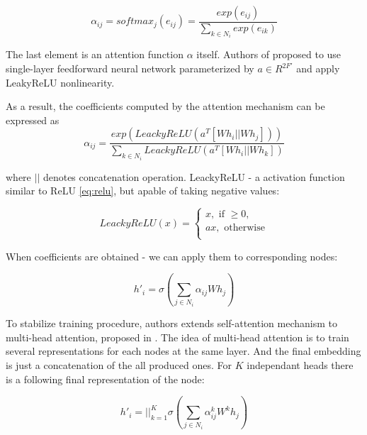 \begin{equation}
   \alpha_{ij} = softmax_j(e_{ij}) = \frac{exp(e_{ij})}{\sum_{k \in N_i}exp(e_{ik})}
\end{equation}

The last element is an attention function $\alpha$ itself. Authors of \cite{GAT} proposed to use
single-layer feedforward neural network parameterized by $a \in R^{2F'}$ and apply LeakyReLU nonlinearity.

As a result, the coefficients computed by the attention mechanism can be expressed as
\begin{equation}
    \alpha_{ij} = \frac{exp(LeackyReLU(a^{T}[Wh_i || Wh_j]))}{\sum_{k \in N_i}LeackyReLU(a^{T}[Wh_i || Wh_k])}
    \label{eq:final_att_coef}
 \end{equation}

where $||$ denotes concatenation operation. LeackyReLU - a activation function similar to ReLU \ref{eq:relu}, but
apable of taking negative values:

\begin{equation}
    LeackyReLU(x) = 
    \begin{cases}
        x, \text{ if } \geq 0, \\
        ax, \text{ otherwise} \\
    \end{cases}
    \label{eq:leacky_relu}
\end{equation}



When coefficients are obtained - we can apply them to corresponding nodes:

\begin{equation}
    h'_i = \sigma \left( \sum_{j \in {N_i}} \alpha_{ij} W h_j \right)
    \label{eq:final_att}
 \end{equation}

To stabilize training procedure, authors extends self-attention mechanism
to multi-head attention, proposed in \cite{AttentionIsAllYouNeed}.
The idea of multi-head attention is to train several representations for each nodes at the same layer. And the final embedding
is just a concatenation of the all produced ones. For $K$ independant heads  there is a following final representation of the node:


\begin{equation}
    h'_i = ||_{k=1}^{K}  \sigma \left( \sum_{j \in {N_i}} \alpha^{k}_{ij} W^{k} h_j \right)
    \label{eq:multihead}
\end{equation}

